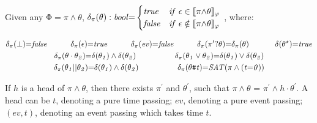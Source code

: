 \documentclass[acmsmall,10pt,review]{acmart}
\newcommand{\es}{\theta}
\newcommand{\ev}{ev}
\newcommand{\effect}{{\ensuremath{\mathrm{\Phi}}}}
\newcommand{\seq}{\cdot}
\newcommand{\choice}{\vee}
\newcommand{\code}[1]{{\tt{\ensuremath{\m{#1}}}}}
\newcommand{\empt}{\textcolor{black}{\ensuremath{\epsilon}}}
\newcommand{\bott}{\textcolor{black}{\ensuremath{\bot}}}
\newcommand{\m}{\mathit}
\newcommand{\mysharp}{{\mathrel{\texttt{\#}}}}
\begin{document}
{\begin{definition}[Nullable]\label{Nullable}
Given any \code{\effect {=} \pi {\wedge} \es}, %
{
  \code{\delta_{{\pi}}(\es) :bool {=}
  \begin{cases}
        \code{true} & \code{if\ \empt \in \llbracket {\pi} {\wedge} \es \rrbracket_{\varphi}}\\
        \code{false} & \code{if\ \empt \notin \llbracket {\pi} {\wedge} \es \rrbracket_{\varphi}}
      \end{cases} }
      }, where:  

{ 
\begin{gather*}
\code{\delta_{\pi}(\bott) {=} false} 
\qquad\quad
\code{\delta_{\pi}(\empt) {=} true} 
\qquad\quad
\code{\delta_{\pi}(\ev){=} false}   
\qquad\quad
\code{\delta_{\pi}(\pi^\prime? \es){=} \delta_{\pi}(\es)}   
\qquad\quad\
    \code{\delta({\es^\star} ) {=} true}   
\\ 
\code{\delta_{\pi}(\es \seq \es_2) {=} \delta(\es_1) \wedge \delta(\es_2)}
\qquad\qquad\quad
  \code{\delta_{\pi}(\es_1 \choice \es_2) {=} \delta(\es_1) \vee \delta(\es_2)}   
  \\
\code{\delta_{\pi}(\es_1 || \es_2) {=} \delta(\es_1) \wedge \delta(\es_2)}
\qquad\qquad\quad
 \code{\delta_{\pi}(\es \mysharp  t) {=} SAT ({\pi} \wedge (t {=} 0) )}
\end{gather*}}
\end{definition}




\begin{definition}[Heads]\label{Heads}
If \code{h} is a head of \code{\pi \wedge \es}, then there exists 
\code{\pi^\prime} and \code{\es^\prime}, 
such that \code{\pi \wedge \es} {=} \code{\pi^\prime \wedge h \cdot \es^\prime}. 
A head can be  $t$, denoting a pure time passing; 
  $\ev $, denoting a pure event passing; 
  $(\ev, t)$, denoting an event passing which takes time \code{t}. 
\end{definition}


}
\end{document}
